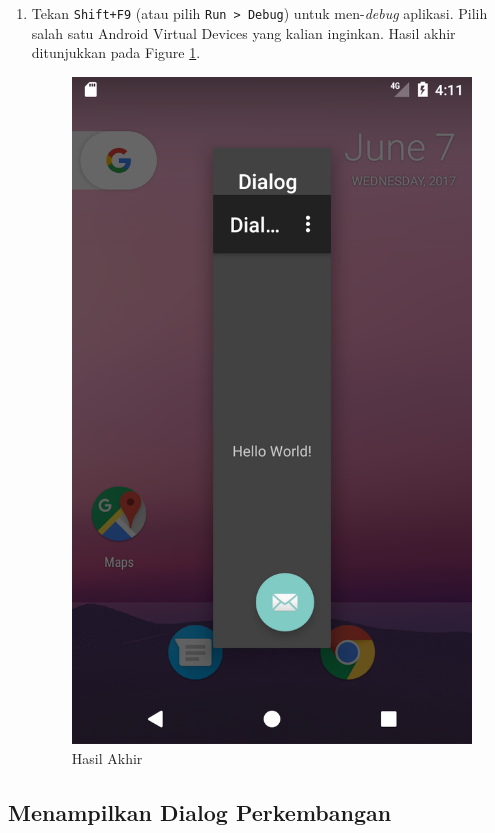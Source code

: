 \documentclass{scrartcl}
\begin{document}
\begin{enumerate}
	\item Tekan \texttt{Shift+F9} (atau pilih \texttt{Run > Debug}) untuk men-\textit{debug} aplikasi. Pilih salah satu Android Virtual Devices yang kalian inginkan. Hasil akhir ditunjukkan pada Figure \ref{fig:screenshot_1496826673}.
	
	\begin{figure}[htbp]
		\centering
		\includegraphics[width=0.5\linewidth]{Screenshot_1496826673}
		\caption{Hasil Akhir}
		\label{fig:screenshot_1496826673}
	\end{figure}
	
\end{enumerate}

\subsection{Menampilkan Dialog Perkembangan}
\end{document}
